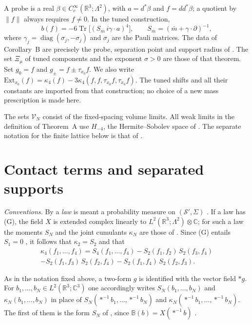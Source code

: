 \documentclass[11pt]{amsart}
\theoremstyle{definition}
\begin{document}
A probe is a real $\beta\in C_c^\infty(\mathbb R^3;\Lambda^2)$, with
$a=d^*\beta$ and $f=dd^*\beta$; a quotient by $\|f\|$ always requires
$f\ne0$. In the tuned construction,
\[
b(f)=-6\operatorname{Tr}\bigl[(S_{\bar m}\,i\gamma\cdot a)^4\bigr],
\qquad S_{\bar m}=(\bar m+\gamma\cdot\partial)^{-1},
\]
where $\gamma_j=\operatorname{diag}(\sigma_j,-\sigma_j)$ and $\sigma_j$
are the Pauli matrices. The data of Corollary~B are precisely the probe,
separation point and support radius of \cite[Proposition~43.2; Theorem~44]{QEDIII}.
The set $\Xi_\mu$ of tuned components and the exponent $\sigma>0$ are
those of that theorem. Set $g_0=f$ and $g_\pm=f\pm\tau_{x_0}f$. We also write
$\mathrm{Ext}_{x_0}(f)=\allowbreak \kappa_4(f)-3\kappa_4(f,\allowbreak f,\allowbreak \tau_{x_0}f,\allowbreak \tau_{x_0}f)$.
The tuned shifts and all their constants are imported from that
construction; no choice of a new mass prescription is made here.

The sets $\mathcal V_N$ consist of the fixed-spacing volume limits.
All weak limits in the definition of Theorem~A use $H_{-4}$, the
Hermite--Sobolev space of \cite[Sections~2.4 and~7.1.5]{QEDI}.
The separate notation for the finite lattice below is that of
\cite[Sections~2 and~3]{QEDII}.


\section{Contact terms and separated supports}

\emph{Conventions.}
By a \emph{law} is meant a probability measure on $(\mathcal S',\Sigma)$ \cite[Notation~(n1)]{QEDIII}.
If a law has (G), the field $X$ is extended complex linearly to $L^2(\mathbb{R}^3;\Lambda^2)\otimes\mathbb{C}$; for such a law the moments $S_N$ and the joint cumulants $\kappa_N$ are those of \cite[Notation~(n5),~(n8)]{QEDIII}.
Since (G) entails $S_1=0$ \cite[Proposition~45.2\,(1),~(8)]{QEDIII}, it follows that $\kappa_2=S_2$ and that
\begin{multline*}
\kappa_4(f_1,\dots,f_4)=S_4(f_1,\dots,f_4)-S_2(f_1,f_2)\,S_2(f_3,f_4)\\
-S_2(f_1,f_3)\,S_2(f_2,f_4)-S_2(f_1,f_4)\,S_2(f_2,f_3).
\end{multline*}

As in the notation fixed above, a two-form $g$ is identified with the vector field $\ast g$.
For $b_1,\dots,b_N\in L^2(\mathbb{R}^3;\mathbb{C}^3)$ one accordingly writes $S_N(b_1,\dots,b_N)$ and $\kappa_N(b_1,\dots,b_N)$ in place of $S_N(\ast^{-1}b_1,\dots,\ast^{-1}b_N)$ and $\kappa_N(\ast^{-1}b_1,\dots,\ast^{-1}b_N)$.
The first of them is the form $S_N$ of \cite[Lemma~14.3\,(b)]{QEDII}, since $\mathbb{B}(b)=X(\ast^{-1}b)$ \cite[Definition~14.1]{QEDII}.
\end{document}
